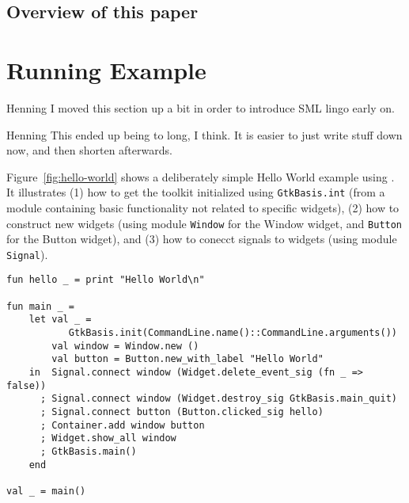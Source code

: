 \documentclass[workingdraft,endnotes]{usetex-v1}
\begin{document}
\subsection{Overview of this paper}
\label{sec:overview-this-paper}



\section{Running Example}
\label{sec:example}

\begin{ednote}{Henning}
  I moved this section up a bit in order to introduce SML lingo
  early on.
\end{ednote}

\begin{ednote}{Henning}
  This ended up being to long, I think.
  It is easier to just write stuff down now, and then shorten
  afterwards.
\end{ednote}

Figure~\ref{fig:hello-world} shows a deliberately simple Hello World example
using \mgtk. It illustrates (1) how to get the toolkit initialized
using \texttt{GtkBasis.int} (from a module containing basic \gtk
functionality not related to specific widgets), (2) how to construct
new widgets (using module \texttt{Window} for the Window widget,
and \texttt{Button} for the Button widget), and (3) how to conecct
signals to widgets (using module \texttt{Signal}).
\begin{figure*}[htbp]
\begin{centering}
\begin{verbatim}
fun hello _ = print "Hello World\n"

fun main _ =
    let val _ = 
           GtkBasis.init(CommandLine.name()::CommandLine.arguments())
        val window = Window.new ()
        val button = Button.new_with_label "Hello World"
    in  Signal.connect window (Widget.delete_event_sig (fn _ => false))
      ; Signal.connect window (Widget.destroy_sig GtkBasis.main_quit)
      ; Signal.connect button (Button.clicked_sig hello)
      ; Container.add window button
      ; Widget.show_all window
      ; GtkBasis.main() 
    end

val _ = main()
\end{verbatim}
\caption{Hello World in \mgtk.\label{fig:hello-world}}
\end{centering}
\end{figure*}
\end{document}
